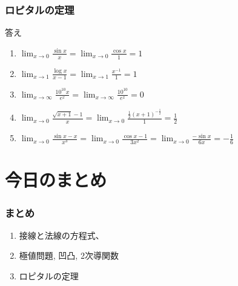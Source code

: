 \begin{frame}
\frametitle{ロピタルの定理}

答え

\begin{enumerate}
\item $\displaystyle \lim_{x\to 0} \frac{\sin x}{x}= \lim_{x\to 0} \frac{\cos x}{1}=1$ \vspace{3mm}
\item  $\displaystyle \lim_{x\to 1} \frac{\log x}{x-1}= \lim_{x\to 1} \frac{x^{-1}}{1}=1$ \vspace{3mm}
\item $\displaystyle \lim_{x\to \infty} \frac{10^{10}x}{e^x}= \lim_{x\to \infty} \frac{10^{10}}{e^x}=0$ \vspace{3mm}
\item $\displaystyle \lim_{x\to 0} \frac{\sqrt{x+1}-1}{x}= \lim_{x\to 0} \frac{\frac{1}{2}(x+1)^{-\frac{1}{2}}}{1}=\frac{1}{2}$ \vspace{3mm}
\item $\displaystyle \lim_{x\to 0} \frac{\sin x-x}{x^3}= \lim_{x\to 0} \frac{\cos x-1}{3x^2}= \lim_{x\to 0} \frac{-\sin x}{6x}=-\frac{1}{6}$ 
\end{enumerate}


\end{frame}










\section{今日のまとめ}
\begin{frame}
\frametitle{まとめ}   


\begin{enumerate}
\item 接線と法線の方程式、
\item 極値問題, 凹凸, 2次導関数
\item ロピタルの定理
\end{enumerate} 

\end{frame}
